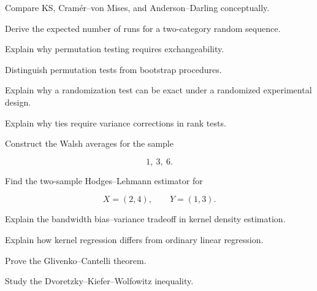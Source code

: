 \begin{exercise}[3]
Compare KS, Cramér--von Mises, and Anderson--Darling conceptually.
\end{exercise}

\begin{exercise}[3]
Derive the expected number of runs for a two-category random sequence.
\end{exercise}

\begin{exercise}[3]
Explain why permutation testing requires exchangeability.
\end{exercise}

\begin{exercise}[3]
Distinguish permutation tests from bootstrap procedures.
\end{exercise}

\begin{exercise}[3]
Explain why a randomization test can be exact under a randomized
experimental design.
\end{exercise}

\begin{exercise}[3]
Explain why ties require variance corrections in rank tests.
\end{exercise}

\begin{exercise}[3]
Construct the Walsh averages for the sample

\[
1,\ 3,\ 6.
\]
\end{exercise}

\begin{exercise}[3]
Find the two-sample Hodges--Lehmann estimator for

\[
X=(2,4),
\qquad
Y=(1,3).
\]
\end{exercise}

\begin{exercise}[3]
Explain the bandwidth bias--variance tradeoff in kernel density
estimation.
\end{exercise}

\begin{exercise}[3]
Explain how kernel regression differs from ordinary linear regression.
\end{exercise}

\begin{exercise}[4]
Prove the Glivenko--Cantelli theorem.
\end{exercise}

\begin{exercise}[4]
Study the Dvoretzky--Kiefer--Wolfowitz inequality.
\end{exercise}

